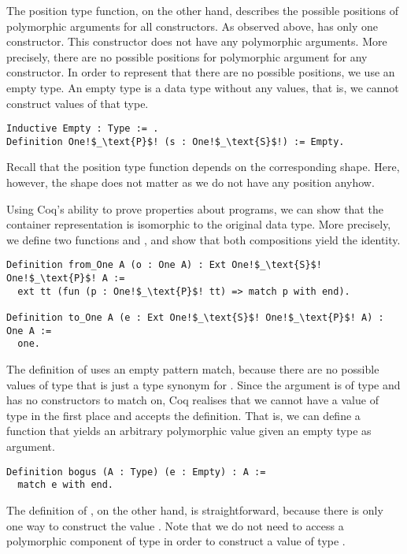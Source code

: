 The position type function, on the other hand, describes the possible positions of polymorphic arguments for all constructors.
As observed above,  has only one constructor.
This constructor  does not have any polymorphic arguments.
More precisely, there are no possible positions for polymorphic argument for any constructor.
In order to represent that there are no possible positions, we use an empty type.
An empty type is a data type without any values, that is, we cannot construct values of that type.

\begin{verbatim}
Inductive Empty : Type := .
Definition One!$_\text{P}$! (s : One!$_\text{S}$!) := Empty.
\end{verbatim}

Recall that the position type function depends on the corresponding shape.
Here, however, the shape does not matter as we do not have any position anyhow.

Using Coq's ability to prove properties about programs, we can show that the container representation is isomorphic to the original data type.
More precisely, we define two functions  and , and show that both compositions yield the identity.

\begin{verbatim}
Definition from_One A (o : One A) : Ext One!$_\text{S}$! One!$_\text{P}$! A :=
  ext tt (fun (p : One!$_\text{P}$! tt) => match p with end).

Definition to_One A (e : Ext One!$_\text{S}$! One!$_\text{P}$! A) : One A :=
  one.
\end{verbatim}

The definition of  uses an empty pattern match, because there are no possible values of type  that is just a type synonym for .
Since the argument  is of type  and  has no constructors to match on, Coq realises that we cannot have a value of type  in the first place and accepts the definition.
That is, we can define a function that yields an arbitrary polymorphic value given an empty type as argument.

\begin{verbatim}
Definition bogus (A : Type) (e : Empty) : A :=
  match e with end.
\end{verbatim}

The definition of , on the other hand, is straightforward, because there is only one way to construct the value .
Note that we do not need to access a polymorphic component of type  in order to construct a value of type .

